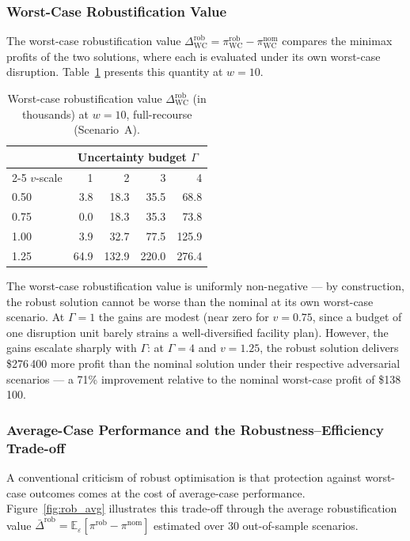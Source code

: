 \subsubsection*{Worst-Case Robustification Value}

The worst-case robustification value
$\Delta^{\mathrm{rob}}_{\mathrm{WC}} =
\pi^{\mathrm{rob}}_{\mathrm{WC}} - \pi^{\mathrm{nom}}_{\mathrm{WC}}$
compares the minimax profits of the two solutions, where each is
evaluated under its own worst-case disruption.
Table~\ref{tab:wc_rob_val} presents this quantity at $w = 10$.

\begin{table}[htbp]
\centering
\caption{Worst-case robustification value $\Delta^{\mathrm{rob}}_{\mathrm{WC}}$
         (in thousands) at $w = 10$, full-recourse (Scenario~A).}
\label{tab:wc_rob_val}
\setlength{\tabcolsep}{6pt}
\begin{tabular}{lrrrr}
\toprule
& \multicolumn{4}{c}{Uncertainty budget $\Gamma$} \\
\cmidrule(lr){2-5}
$v$-scale & 1 & 2 & 3 & 4 \\
\midrule
0.50 & 3.8  & 18.3  & 35.5  & 68.8  \\
0.75 & 0.0  & 18.3  & 35.3  & 73.8  \\
1.00 & 3.9  & 32.7  & 77.5  & 125.9 \\
1.25 & 64.9 & 132.9 & 220.0 & 276.4 \\
\bottomrule
\end{tabular}
\end{table}

The worst-case robustification value is uniformly non-negative — by
construction, the robust solution cannot be worse than the nominal at
its own worst-case scenario.
At $\Gamma = 1$ the gains are modest (near zero for $v = 0.75$, since
a budget of one disruption unit barely strains a well-diversified
facility plan).  However, the gains escalate sharply with $\Gamma$: at
$\Gamma = 4$ and $v = 1.25$, the robust solution delivers
\$276\,400 more profit than the nominal solution under their respective
adversarial scenarios — a 71\% improvement relative to the nominal
worst-case profit of \$138\,100.

\subsubsection*{Average-Case Performance and the Robustness--Efficiency Trade-off}

A conventional criticism of robust optimisation is that protection against
worst-case outcomes comes at the cost of average-case performance.
Figure~\ref{fig:rob_avg} illustrates this trade-off through the
average robustification value $\bar{\Delta}^{\mathrm{rob}} =
\mathbb{E}_\varepsilon[\pi^{\mathrm{rob}} - \pi^{\mathrm{nom}}]$
estimated over 30 out-of-sample scenarios.

